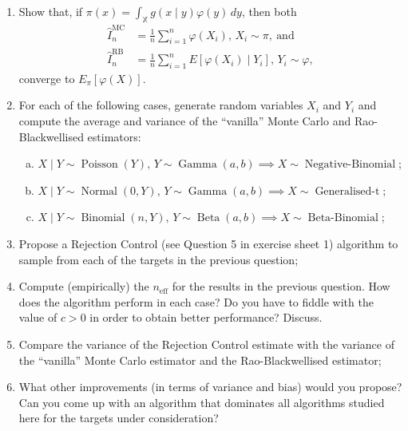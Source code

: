 \documentclass[a4paper,10pt, notitlepage]{report}
\begin{document}
\begin{enumerate}
 \item Show that, if $\pi(x) = \int_{\mathbb{X}} g(x\mid y) \varphi(y)\,dy$, then both
 \begin{align*}
 \hat{I}_n^{\text{MC}} &= \frac{1}{n} \sum_{i=1}^n \varphi(X_i), \, X_i \sim \pi, \: \text{and}\\
 \hat{I}_n^{\text{RB}} &= \frac{1}{n} \sum_{i=1}^n E[\varphi(X_i) \mid Y_i] , \, Y_i \sim \varphi, 
 \end{align*}
converge to $E_\pi[\varphi(X)]$.
\item For each of the following cases, generate random variables $X_i$ and $Y_i$ and compute the average and variance of the ``vanilla'' Monte Carlo and Rao-Blackwellised estimators:
\begin{enumerate}[(a)]
 \item $X\mid Y \sim \operatorname{Poisson}(Y),\, Y \sim \operatorname{Gamma}(a, b) \implies X \sim \operatorname{Negative-Binomial}$;
  \item $X\mid Y \sim \operatorname{Normal}(0, Y),\, Y \sim \operatorname{Gamma}(a, b) \implies X \sim \operatorname{Generalised-t}$;
   \item $X\mid Y \sim \operatorname{Binomial}(n, Y),\, Y \sim \operatorname{Beta}(a, b) \implies X \sim \operatorname{Beta-Binomial}$;
 \end{enumerate}
 
 \item Propose a Rejection Control (see Question 5 in exercise sheet 1) algorithm to sample from each of the targets in the previous question;
 \item Compute (empirically) the $n_{\text{eff}}$ for the results in the previous question.
 How does the algorithm perform in each case? 
 Do you have to fiddle with the value of $c >0$ in order to obtain better performance?
 Discuss.
 \item Compare the variance of the Rejection Control estimate with the variance of the ``vanilla'' Monte Carlo estimator and the Rao-Blackwellised  estimator;
 \item What other improvements (in terms of variance and bias) would you propose?
 Can you come up with an algorithm that dominates all algorithms studied here for the targets under consideration?
\end{enumerate}

% 
% 
% 
\end{document}
